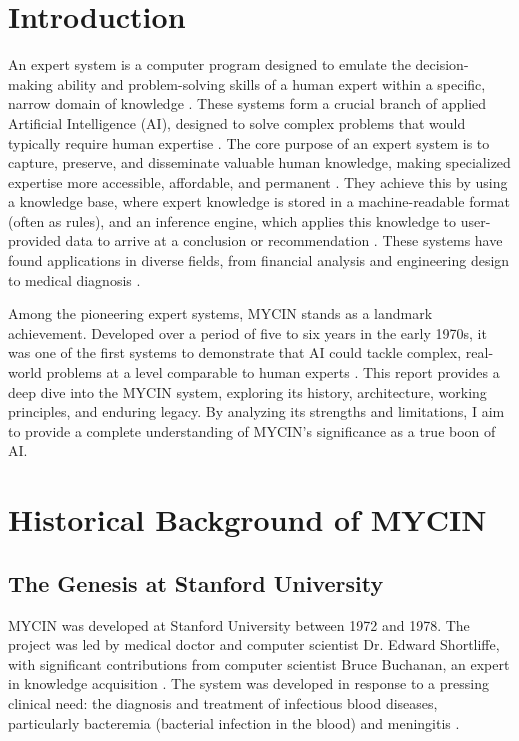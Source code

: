 \documentclass[conference]{IEEEtran}
\begin{document}
\section{Introduction}
An expert system is a computer program designed to emulate the decision-making ability and problem-solving skills of a human expert within a specific, narrow domain of knowledge \cite{b1}. These systems form a crucial branch of applied Artificial Intelligence (AI), designed to solve complex problems that would typically require human expertise \cite{b2}. The core purpose of an expert system is to capture, preserve, and disseminate valuable human knowledge, making specialized expertise more accessible, affordable, and permanent \cite{b3}. They achieve this by using a knowledge base, where expert knowledge is stored in a machine-readable format (often as rules), and an inference engine, which applies this knowledge to user-provided data to arrive at a conclusion or recommendation \cite{b4}. These systems have found applications in diverse fields, from financial analysis and engineering design to medical diagnosis \cite{b5}.

Among the pioneering expert systems, MYCIN stands as a landmark achievement. Developed over a period of five to six years in the early 1970s, it was one of the first systems to demonstrate that AI could tackle complex, real-world problems at a level comparable to human experts \cite{b6, b7}. This report provides a deep dive into the MYCIN system, exploring its history, architecture, working principles, and enduring legacy. By analyzing its strengths and limitations, I aim to provide a complete understanding of MYCIN's significance as a true boon of AI.

\section{Historical Background of MYCIN}
\subsection{The Genesis at Stanford University}
MYCIN was developed at Stanford University between 1972 and 1978. The project was led by medical doctor and computer scientist Dr. Edward Shortliffe, with significant contributions from computer scientist Bruce Buchanan, an expert in knowledge acquisition \cite{b8, b9}. The system was developed in response to a pressing clinical need: the diagnosis and treatment of infectious blood diseases, particularly bacteremia (bacterial infection in the blood) and meningitis \cite{b10}.
\end{document}
